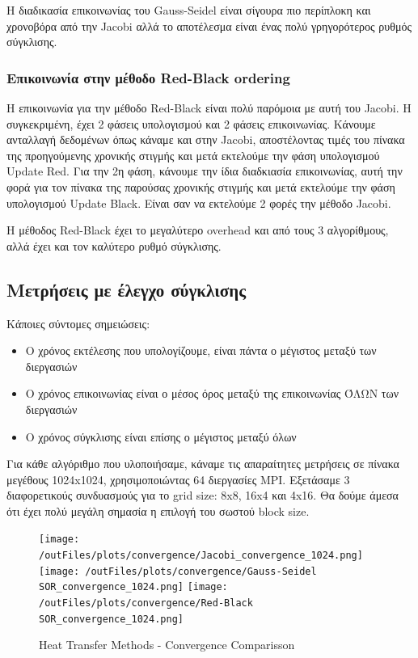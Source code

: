 \documentclass[../final_report.tex]{subfiles}
\begin{document}
Η διαδικασία επικοινωνίας του Gauss-Seidel είναι σίγουρα πιο περίπλοκη και χρονοβόρα από την Jacobi αλλά το αποτέλεσμα είναι ένας πολύ γρηγορότερος ρυθμός σύγκλισης.

\subsubsection*{Επικοινωνία στην μέθοδο Red-Black ordering}

Η επικοινωνία για την μέθοδο Red-Black είναι πολύ παρόμοια με αυτή του Jacobi. Η συγκεκριμένη, έχει 2 φάσεις υπολογισμού και 2 φάσεις επικοινωνίας.
Κάνουμε ανταλλαγή δεδομένων όπως κάναμε και στην Jacobi, αποστέλοντας τιμές του πίνακα της προηγούμενης χρονικής στιγμής και μετά εκτελούμε την φάση υπολογισμού
Update Red. Για την 2η φάση, κάνουμε την ίδια διαδκιασία επικοινωνίας, αυτή την φορά για τον πίνακα της παρούσας χρονικής στιγμής και μετά εκτελούμε την φάση υπολογισμού
Update Black. Είναι σαν να εκτελούμε 2 φορές την μέθοδο Jacobi.

Η μέθοδος Red-Black έχει το μεγαλύτερο overhead και από τους 3 αλγορίθμους, αλλά έχει και τον καλύτερο ρυθμό σύγκλισης.

\subsection{Μετρήσεις με έλεγχο σύγκλισης}

Κάποιες σύντομες σημειώσεις:
\begin{itemize}
    \item Ο χρόνος εκτέλεσης που υπολογίζουμε, είναι πάντα ο μέγιστος μεταξύ των διεργασιών
    \item Ο χρόνος επικοινωνίας είναι ο μέσος όρος μεταξύ της επικοινωνίας ΌΛΩΝ των διεργασιών
    \item Ο χρόνος σύγκλισης είναι επίσης ο μέγιστος μεταξύ όλων
\end{itemize}

Για κάθε αλγόριθμο που υλοποιήσαμε, κάναμε τις απαραίτητες μετρήσεις σε πίνακα μεγέθους 1024x1024, χρησιμοποιώντας 64 διεργασίες
MPI. Εξετάσαμε 3 διαφορετικούς συνδυασμούς για το grid size: 8x8, 16x4 και 4x16. Θα δούμε άμεσα ότι έχει πολύ μεγάλη σημασία
η επιλογή του σωστού block size.

\begin{figure}[H]
    \centering
    \texttt{[image: /outFiles/plots/convergence/Jacobi\_convergence\_1024.png]}
    \texttt{[image: /outFiles/plots/convergence/Gauss-Seidel SOR\_convergence\_1024.png]}
    \texttt{[image: /outFiles/plots/convergence/Red-Black SOR\_convergence\_1024.png]}
    \caption{Heat Transfer Methods - Convergence Comparisson}
    \label{fig:Heat Transfer Methods - Convergence Comparisson}
\end{figure}
\end{document}
